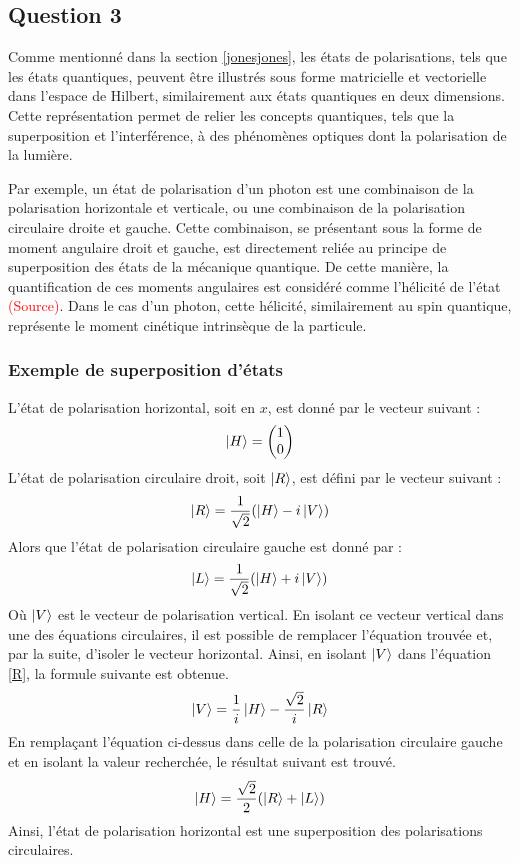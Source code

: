 \documentclass[11pt,letterpaper]{article}
\begin{document}
\subsection{Question 3}
Comme mentionné dans la section \ref{jonesjones}, les états de polarisations, tels que les états quantiques, peuvent être illustrés sous forme matricielle et vectorielle dans l'espace de Hilbert, similairement aux états quantiques en deux dimensions. Cette représentation permet de relier les concepts quantiques, tels que la superposition et l'interférence, à des phénomènes optiques dont la polarisation de la lumière. 

Par exemple, un état de polarisation d'un photon est une combinaison de la polarisation horizontale et verticale, ou une combinaison de la polarisation circulaire droite et gauche. Cette combinaison, se présentant sous la forme de moment angulaire droit et gauche, est directement reliée au principe de superposition des états de la mécanique quantique. De cette manière, la quantification de ces moments angulaires est considéré comme l'hélicité de l'état \textcolor{red}{(Source)}. Dans le cas d'un photon, cette hélicité, similairement au spin quantique, représente le moment cinétique intrinsèque de la particule.

\subsubsection{Exemple de superposition d'états}
L'état de polarisation horizontal, soit en $x$, est donné par le vecteur suivant :
\begin{equation}
  \ket{H}=
  \begin{pmatrix}
    1 \\
    0 \\
  \end{pmatrix}
\end{equation}
L'état de polarisation circulaire droit, soit $\ket{R}$, est défini par le vecteur suivant :
\begin{equation}
  \ket{R}=\frac{1}{\sqrt{2}}(\ket{H}-i\ket{V})
  \label{R}
\end{equation}
Alors que l'état de polarisation circulaire gauche est donné par :
\begin{equation}
  \ket{L}=\frac{1}{\sqrt{2}}(\ket{H}+i\ket{V})
\end{equation}
Où $\ket{V}$ est le vecteur de polarisation vertical. En isolant ce vecteur vertical dans une des équations circulaires, il est possible de remplacer l'équation trouvée et, par la suite, d'isoler le vecteur horizontal. Ainsi, en isolant $\ket{V}$ dans l'équation \ref{R}, la formule suivante est obtenue.
\begin{equation}
  \ket{V}=\frac{1}{i}\ket{H}-\frac{\sqrt{2}}{i}\ket{R}
\end{equation}
En remplaçant l'équation ci-dessus dans celle de la polarisation circulaire gauche et en isolant la valeur recherchée, le résultat suivant est trouvé.
\begin{equation}
  \ket{H}=\frac{\sqrt{2}}{2}(\ket{R}+\ket{L})
\end{equation}
Ainsi, l'état de polarisation horizontal est une superposition des polarisations circulaires.
\end{document}
